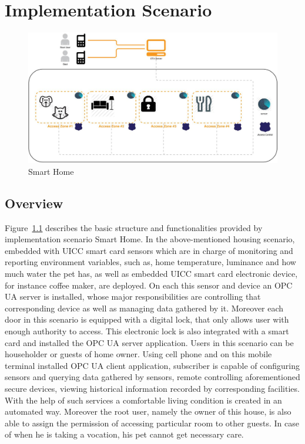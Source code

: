 \chapter{Implementation Scenario}
 \begin{figure}[!htbp]
	\centering
	\includegraphics[width=1\textwidth]{homeoverview.jpg}
		\caption{Smart Home}
	\label{fig:SmartHome}
\end{figure}

\section{Overview}
Figure~\ref{fig:SmartHome} describes the basic structure and functionalities provided by implementation scenario Smart Home.
In the above-mentioned housing scenario, embedded with UICC smart card sensors which are in charge of monitoring and reporting environment variables, such as, home temperature, luminance and how much water the pet has, as well as embedded UICC smart card electronic device, for instance coffee maker, are deployed. On each this sensor and device an OPC UA server is installed, whose major responsibilities are controlling that corresponding device as well as managing data gathered by it.  Moreover each door in this scenario is equipped with a digital lock, that only allows user with enough authority to access. This electronic lock is also integrated with a smart card and installed the OPC UA server application. Users in this scenario can be householder or guests of home owner. Using cell phone and on this mobile terminal installed OPC UA client application, subscriber is capable of configuring sensors and querying data gathered by sensors, remote controlling aforementioned secure devices, viewing historical information recorded by corresponding facilities. With the help of such services a comfortable living condition is created in an automated way.  Moreover the root user, namely the owner of this house, is also able to assign the permission of accessing particular room to other guests. In case of when he is taking a vocation, his pet cannot get necessary care.


